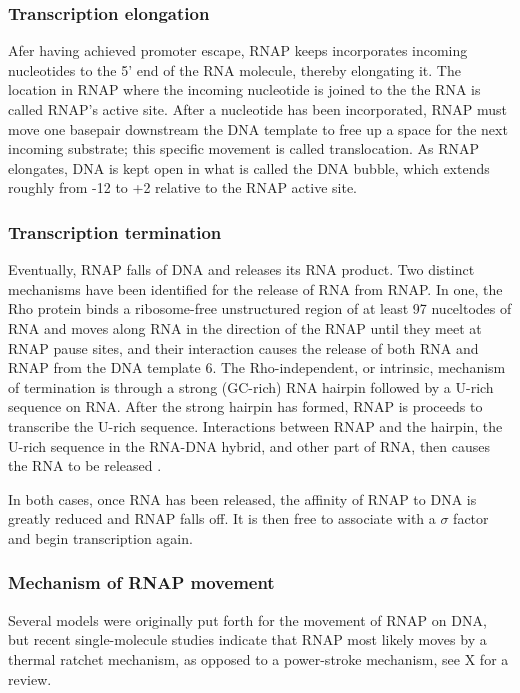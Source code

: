 \subsubsection{Transcription elongation}
Afer having achieved promoter escape, RNAP keeps incorporates incoming
nucleotides to the 5' end of the RNA molecule, thereby elongating it. The
location in RNAP where the incoming nucleotide is joined to the the RNA is
called RNAP's active site. After a nucleotide has been incorporated, RNAP must
move one basepair downstream the DNA template to free up a space for the next
incoming substrate; this specific movement is called translocation. As RNAP
elongates, DNA is kept open in what is called the DNA bubble, which extends
roughly from -12 to +2 relative to the RNAP active site.

\subsubsection{Transcription termination}
Eventually, RNAP falls of DNA and releases its RNA product. Two distinct
mechanisms have been identified for the release of RNA from RNAP. In one, the Rho
protein binds a ribosome-free unstructured region of at least 97 nuceltodes of
RNA and moves along RNA in the direction of the RNAP until they meet at RNAP
pause sites, and their interaction causes the release of both RNA and RNAP from
the DNA template \cite{ciampi_rho-dependent_2006}6. The
Rho-independent, or intrinsic, mechanism of termination is through a strong
(GC-rich) RNA hairpin followed by a U-rich sequence on RNA. After the strong
hairpin has formed, RNAP is proceeds to transcribe the U-rich sequence.
Interactions between RNAP and the hairpin, the U-rich sequence in the RNA-DNA
hybrid, and other part of RNA, then causes the RNA to be released
\cite{nudler_transcription_2002}.

In both cases, once RNA has been released, the affinity of RNAP to DNA is
greatly reduced and RNAP falls off. It is then free to associate with a
$\sigma$ factor and begin transcription again.

\subsubsection{Mechanism of RNAP movement}
Several models were originally put forth for the movement of RNAP on DNA, but
recent single-molecule studies indicate that RNAP most likely moves by a
thermal ratchet mechanism, as opposed to a power-stroke mechanism, see X for a
review.

